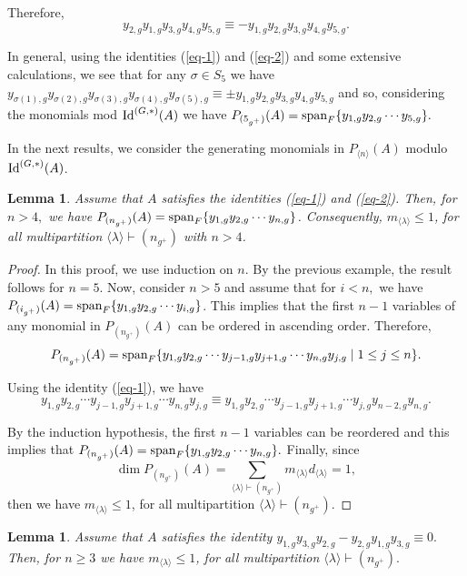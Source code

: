 \documentclass{amsart}
\newcommand{\IdG}{\ensuremath{\textnormal{Id}^{(G,\ast)}}}
\newcommand{\spam}{\ensuremath{\textnormal{span}}}
\newtheorem{lema}[teorema]{Lemma}
\numberwithin{equation}{section}
\begin{document}
Therefore,   $$y_{2,g}y_{1,g}y_{3,g}y_{4,g}y_{5,g} \equiv -  y_{1,g}y_{2,g}y_{3,g}y_{4,g}y_{5,g} .$$ 


 In general, using the identities (\ref{eq-1}) and (\ref{eq-2}) and some extensive calculations, we see that for any $\sigma \in S_5$ we have $y_{\sigma(1),g}y_{\sigma(2), g}y_{\sigma(3),g}y_{\sigma(4),g}y_{\sigma(5),g}\equiv \pm y_{1,g}y_{2,g}y_{3,g}y_{4,g}y_{5,g}$ and so, considering the monomials mod $\IdG(A)$ we have $P_{(5_{g^+})}(A)=\spam_F\{y_{1,g}y_{2,g}\cdots y_{5,g}\}. $   



 In the next results, we consider the generating monomials in $P_{\langle n\rangle}(A)$ modulo $\IdG(A)$.
 
 \begin{lema}\label{ref0.2} 
Assume that $A$ satisfies the identities (\ref{eq-1}) and (\ref{eq-2}). Then, for $n>4,$ we have 
  	$P_{(n_{g^+})}(A)= \spam_F\{y_{1,g}y_{2,g}\cdots y_{n,g}\}$. Consequently, $m_{\langle \lambda \rangle}\le 1$, for all multipartition $\langle \lambda \rangle \vdash (n_{g^+})$ with $n> 4$.
	\end{lema}

\begin{proof} 
In this proof, we use induction on $n$. By the previous example, the result follows for $n=5$. Now, consider $n>5$ and assume that for $i<n,$ we have $P_{({i}_{g^+})}(A)=\spam_F\{y_{1,g}y_{2,g}\cdots y_{i,g}\}$. This implies that the first $n-1$ variables of any monomial in $P_{(n_{g^+})}(A)$ can be ordered in ascending order. Therefore, $$P_{(n_{g^+})}(A)=\spam_F\{y_{1,g}y_{2,g}\cdots y_{j-1,g}y_{j+1,g}\cdots y_{n,g} y_{j,g} \mid 1\le j\le n \}.$$ 

Using the identity (\ref{eq-1}), we have $$y_{1,g}y_{2, g}\cdots y_{j-1,g}y_{j+1,g}\cdots y_{n,g} y_{j,g}\equiv y_{1,g}y_{2,g}\cdots y_{j-1,g}y_{j+1,g}\cdots y_{j,g}y_{n-2,g}y_{n,g}. $$

By the induction hypothesis, the first $n-1$ variables can be reordered and this implies that $P_{(n_{g^+})}(A)=\spam_F\{y_{1,g}y_{2,g}\cdots y_{n,g}\}. $ Finally, since $$\dim P_{(n_{g^+})}(A)= \sum\limits_{\langle \lambda \rangle \vdash (n_{g^+})} {m_{\langle \lambda \rangle}d_{\langle \lambda \rangle}}=1,$$ then we have $m_{\langle \lambda \rangle}\le 1$, for all multipartition $\langle \lambda \rangle \vdash (n_{g^+})$.
\end{proof}

 \begin{lema}{\label{ref0.3}} 
Assume that $A$ satisfies the identity $y_{1,g}y_{3,g}y_{2,g}-y_{2,g}y_{1,g}y_{3,g}\equiv 0.$ Then, for $n\ge 3$ we have $m_{\langle \lambda \rangle}\le 1$, for all multipartition $\langle \lambda \rangle \vdash (n_{g^+}).$
	\end{lema} 
\end{document}
